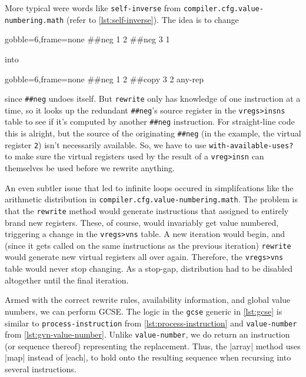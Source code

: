 \begin{sloppypar}
More typical were words like \Verb|self-inverse| from
\Verb|compiler.cfg.value-numbering.math| (refer to \vref{lst:self-inverse}).
The idea is to change
%
\begin{center}
  \begin{minipage}{0.2\linewidth}
    \begin{factorcode*}{gobble=6,frame=none}
      ##neg 1 2
      ##neg 3 1
    \end{factorcode*}
  \end{minipage}
\end{center}
%
\noindent into
%
\begin{center}
  \begin{minipage}{0.2\linewidth}
    \begin{factorcode*}{gobble=6,frame=none}
      ##neg 1 2
      ##copy 3 2 any-rep
    \end{factorcode*}
  \end{minipage}
\end{center}
%
\noindent since \Verb|##neg| undoes itself.  But \Verb|rewrite| only has
knowledge of one instruction at a time, so it looks up the redundant
\Verb|##neg|'s source register in the \Verb|vregs>insns| table to see if
it's computed by another \Verb|##neg| instruction.  For straight-line code this
is alright, but the source of the originating \Verb|##neg| (in the example, the
virtual register \Verb|2|) isn't necessarily available.  So, we have to use
\Verb|with-available-uses?| to make sure the virtual registers used by the
result of a \Verb|vreg>insn| can themselves be used before we rewrite
anything.
\end{sloppypar}

An even subtler issue that led to infinite loops occured in simplifcations like
the arithmetic distribution in \Verb|compiler.cfg.value-numbering.math|.  The
problem is that the \Verb|rewrite| method would generate instructions that
assigned to entirely brand new registers.  These, of course, would invariably
get value numbered, triggering a change in the \Verb|vregs>vns| table.  A new
iteration would begin, and (since it gets called on the same instructions as
the previous iteration) \Verb|rewrite| would generate new virtual registers
all over again.  Therefore, the \Verb|vregs>vns| table would never stop
changing.  As a stop-gap, distribution had to be disabled altogether until the
final iteration.


Armed with the correct rewrite rules, availability information, and global
value numbers, we can perform \gls{GCSE}.  The logic in the \Verb|gcse|
generic in \vref{lst:gcse} is similar to \Verb|process-instruction| from
\cref{lst:process-instruction} and \Verb|value-number| from
\vref{lst:gvn-value-number}.  Unlike \Verb|value-number|, we do return an
instruction (or sequence thereof) representing the replacement.  Thus, the
\factor|array| method uses \factor|map| instead of \factor|each|, to hold onto
the resulting sequence when recursing into several instructions.

